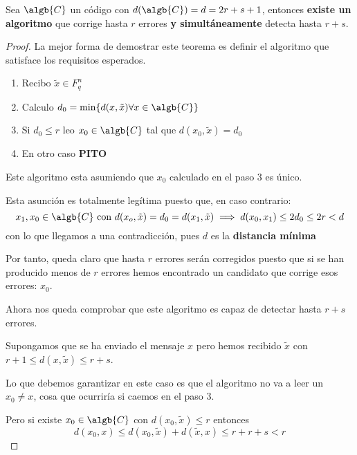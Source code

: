 \begin{theorem}\label{theorem:Codigo_detector_corrector}
Sea $\algb{C}$ un código con $d(\algb{C}) = d=2r+s+1$, entonces \textbf{existe un algoritmo} que corrige hasta $r$ errores \textbf{y simultáneamente} detecta hasta $r+s$.
\end{theorem}
\begin{proof}
La mejor forma de demostrar este teorema es definir el algoritmo que satisface los requisitos esperados.
\begin{enumerate}
\item Recibo $\tilde{x} \in F_q^n$
\item Calculo $d_0 = \min\{d(x,\tilde{x}) \forall x \in \algb{C}\}$
\item Si $d_0 \leq r$ leo $x_0 \in \algb{C}$ tal que $d(x_0,\tilde{x})=d_0$
\item En otro caso \textbf{PITO}
\end{enumerate}

Este algoritmo esta asumiendo que $x_0$ calculado en el paso 3 es único.

Esta asunción es totalmente legítima puesto que, en caso contrario:
\[x_1,x_0 \in \algb{C} \text{ con } d(x_o,\tilde{x})=d_0=d(x_1,\tilde{x}) \implies d(x_0,x_1)\leq 2d_0 \leq 2r < d\]
con lo que llegamos a una contradicción, pues $d$ es la \textbf{distancia mínima}

Por tanto, queda claro que hasta $r$ errores serán corregidos puesto que si se han producido menos de $r$ errores hemos encontrado un candidato que corrige esos errores: $x_0$.

Ahora nos queda comprobar que este algoritmo es capaz de detectar hasta $r+s$ errores.

Supongamos que se ha enviado el mensaje $x$ pero hemos recibido $\tilde{x}$ con $r+1\leq d(x,\tilde{x})\leq r+s$.

Lo que debemos garantizar en este caso es que el algoritmo no va a leer un $x_0 \neq x$, cosa que ocurriría si caemos en el paso 3.

Pero si existe $x_0 \in \algb{C}$ con $d(x_0,\tilde{x})\leq r$ entonces
\[d(x_0,x)\leq d(x_0,\tilde{x})+d(\tilde{x},x) \leq r+r+s < r\]

\end{proof}
